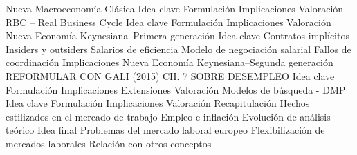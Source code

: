 \documentclass{nuevotema}
\begin{document}
\begin{esquema}[enumerate]
		\2 Nueva Macroeconomía Clásica
			\3 Idea clave
			\3 Formulación
			\3 Implicaciones
			\3 Valoración
		\2 RBC -- Real Business Cycle
			\3 Idea clave
			\3 Formulación
			\3 Implicaciones
			\3 Valoración
		\2 Nueva Economía Keynesiana--Primera generación
			\3 Idea clave
			\3 Contratos implícitos
			\3 Insiders y outsiders
			\3 Salarios de eficiencia
			\3 Modelo de negociación salarial
			\3 Fallos de coordinación
			\3 Implicaciones
		\2 Nueva Economía Keynesiana--Segunda generación
			\3 REFORMULAR CON GALI (2015) CH. 7  SOBRE DESEMPLEO
			\3 Idea clave
			\3 Formulación
			\3 Implicaciones
			\3 Extensiones
			\3 Valoración
		\2 Modelos de búsqueda - DMP
			\3 Idea clave
			\3 Formulación
			\3 Implicaciones
			\3 Valoración
	\1[] 
		\2 Recapitulación
			\3 Hechos estilizados en el mercado de trabajo
			\3 Empleo e inflación
			\3 Evolución de análisis teórico
		\2 Idea final
			\3 Problemas del mercado laboral europeo
			\3 Flexibilización de mercados laborales
			\3 Relación con otros conceptos

\end{esquema}

\esquemalargo
\end{document}
